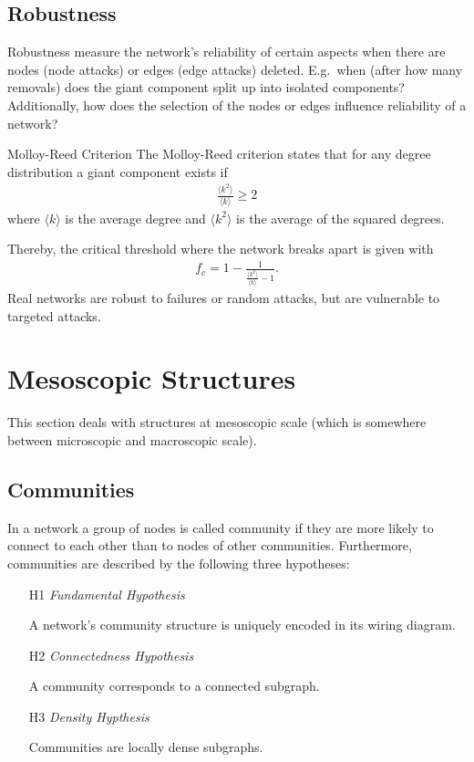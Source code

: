\documentclass[english]{panikzettel}
\begin{document}
\subsection{Robustness} \label{sec:robustness}
Robustness measure the network's reliability of certain aspects when there are nodes (node attacks) or edges (edge attacks) deleted.
E.g.\ when (after how many removals) does the giant component split up into isolated components?
Additionally, how does the selection of the nodes or edges influence reliability of a network?

\begin{defi}{Molloy-Reed Criterion}
The Molloy-Reed criterion states that for any degree distribution a giant component exists if
\begin{align*}
	\frac{\langle k^2 \rangle}{\langle k \rangle} \geq 2
\end{align*}
where $ \langle k \rangle $ is the average degree and $ \langle k^2 \rangle $ is the average of the squared degrees.
\end{defi}

Thereby, the critical threshold where the network breaks apart is given with
\begin{align*}
	f_c = 1 - \frac{1}{\frac{\langle k^2 \rangle}{\langle k \rangle} - 1}.
\end{align*}
Real networks are robust to failures or random attacks, but are vulnerable to targeted attacks.

\section{Mesoscopic Structures}
This section deals with structures at mesoscopic scale (which is somewhere between microscopic and macroscopic scale).

\subsection{Communities}
In a network a group of nodes is called community if they are more likely to connect to each other than to nodes of other communities. Furthermore, communities are described by the following three hypotheses:
\begin{itemize}
	\item[H1] \textit{Fundamental Hypothesis}

	A network's community structure is uniquely encoded	in its wiring diagram.

	\item[H2] \textit{Connectedness Hypothesis}

	A community corresponds to a connected subgraph.

	\item[H3] \textit{Density Hypthesis}

	Communities are locally dense subgraphs.
\end{itemize}
\end{document}
